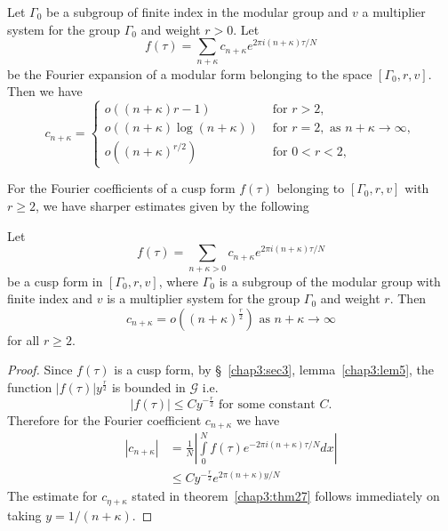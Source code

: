 \begin{thm}\label{chap3:thm26}
Let $\Gamma_0$ be a subgroup of finite index in the modular group and
$v$ a multiplier system for the group $\Gamma_0$ and weight $r>0$. Let 
$$
f(\tau) = \sum_{n+\kappa} c_{n+\kappa} e^{2\pi i (n+\kappa)\tau/N}
$$
be the Fourier expansion of a modular form belonging to the space
$[\Gamma_0, r, v]$. 
Then we have 
$$
c_{n+\kappa} = 
\begin{cases}
o((n+\kappa){r-1}) & \text{ for } r > 2, \\
o((n+\kappa)\log(n+\kappa)) & \text{ for } r=2, \text{ as } n + \kappa
\to \infty, \\
o ((n+\kappa)^{r/2}) & \text{ for } 0 < r< 2, 
\end{cases}
$$
\end{thm}

For \pageoriginale the Fourier coefficients of a cusp form $f(\tau)$
belonging to $[\Gamma_0,r,v]$ with $r\geq 2$, we have sharper
estimates given by the following 

\begin{thm}\label{chap3:thm27}
Let
$$
f(\tau) = \sum_{n+\kappa >0} c_{n+\kappa} e^{2\pi i (n+\kappa)\tau/N}
$$
be a cusp form in $[\Gamma_0, r, v]$, where $\Gamma_0$ is a subgroup
of the modular group with finite index and $v$ is a multiplier system
for the group $\Gamma_0$ and weight $r$. Then 
$$
c_{n+\kappa} = o ((n+\kappa)^{\frac{r}{2}}) \text{ as }  n + \kappa
\to \infty
$$
for all $r\geq 2$.
\end{thm}

\begin{proof}
Since $f(\tau)$ is a cusp form, by \S~\ref{chap3:sec3}, 
lemma~\ref{chap3:lem5}, the function
$|f(\tau)|y^{\frac{r}{2}}$ is bounded in $\mathscr{G}$ i.e. 
$$
|f(\tau)| \leq C y^{-\frac{r}{2}} \text{ for some constant } C.
$$
Therefore for the Fourier coefficient $c_{n+\kappa}$ we have 
\begin{align*}
|c_{n+\kappa}| & = \frac{1}{N}| \int\limits^N_0 f(\tau) e^{-2\pi
  i(n+\kappa)\tau/N} dx|\\
& \leq C y^{-\frac{r}{2}} e^{2\pi(n+\kappa)y/N}
\end{align*}
The estimate for $c_{\eta+\kappa}$ stated in theorem~\ref{chap3:thm27} follows
immediately on taking $y=1/(n+\kappa)$.
\end{proof}

